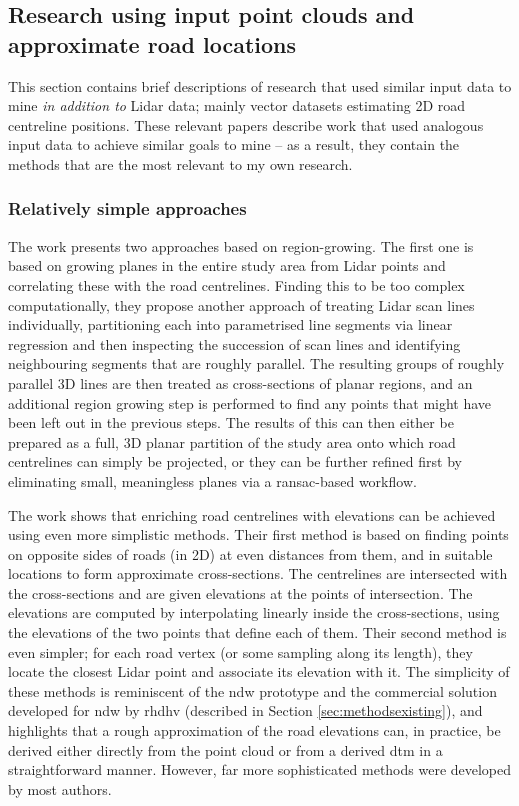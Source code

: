 \subsection{Research using input point clouds and approximate road locations}
\label{sub:lidaraccuracy_external}

This section contains brief descriptions of research that used similar input data to mine \textit{in addition to} Lidar data; mainly vector datasets estimating 2D road centreline positions. These relevant papers describe work that used analogous input data to achieve similar goals to mine – as a result, they contain the methods that are the most relevant to my own research.

\subsubsection{Relatively simple approaches}

The work \cite{hatger_brenner_2003} presents two approaches based on region-growing. The first one is based on growing planes in the entire study area from Lidar points and correlating these with the road centrelines. Finding this to be too complex computationally, they propose another approach of treating Lidar scan lines individually, partitioning each into parametrised line segments via linear regression and then inspecting the succession of scan lines and identifying neighbouring segments that are roughly parallel. The resulting groups of roughly parallel 3D lines are then treated as cross-sections of planar regions, and an additional region growing step is performed to find any points that might have been left out in the previous steps. The results of this can then either be prepared as a full, 3D planar partition of the study area onto which road centrelines can simply be projected, or they can be further refined first by eliminating small, meaningless planes via a \ac{ransac}-based workflow.

The work \cite{cai_rasdorf_2008} shows that enriching road centrelines with elevations can be achieved using even more simplistic methods. Their first method is based on finding points on opposite sides of roads (in 2D) at even distances from them, and in suitable locations to form approximate cross-sections. The centrelines are intersected with the cross-sections and are given elevations at the points of intersection. The elevations are computed by interpolating linearly inside the cross-sections, using the elevations of the two points that define each of them. Their second method is even simpler; for each road vertex  (or some sampling along its length), they locate the closest Lidar point and associate its elevation with it. The simplicity of these methods is reminiscent of the \ac{ndw} prototype and the commercial solution developed for \ac{ndw} by \ac{rhdhv} (described in Section \ref{sec:methodsexisting}), and highlights that a rough approximation of the road elevations can, in practice, be derived either directly from the point cloud or from a derived \ac{dtm} in a straightforward manner. However, far more sophisticated methods were developed by most authors.

